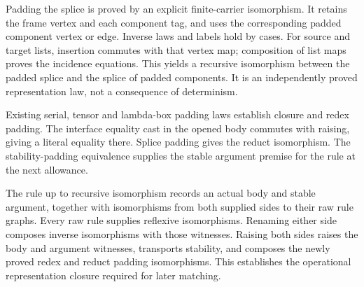 

Padding the splice is proved by an explicit finite-carrier isomorphism.
It retains the frame vertex and each component tag, and uses the corresponding
padded component vertex or edge. Inverse laws and labels hold by cases.
For source and target lists, insertion commutes with that vertex map;
composition of list maps proves the incidence equations. This yields a
recursive isomorphism between the padded splice and the splice of padded
components. It is an independently proved representation law, not a
consequence of determinism.



Existing serial, tensor and lambda-box padding laws establish closure
and redex padding. The interface equality cast in the opened body commutes
with raising, giving a literal equality there. Splice padding gives the
reduct isomorphism. The stability-padding equivalence supplies the stable
argument premise for the rule at the next allowance.






The rule up to recursive isomorphism records an actual body and stable
argument, together with isomorphisms from both supplied sides to their raw
rule graphs. Every raw rule supplies reflexive isomorphisms. Renaming either
side composes inverse isomorphisms with those witnesses. Raising both sides
raises the body and argument witnesses, transports stability, and composes
the newly proved redex and reduct padding isomorphisms. This establishes the
operational representation closure required for later matching.



